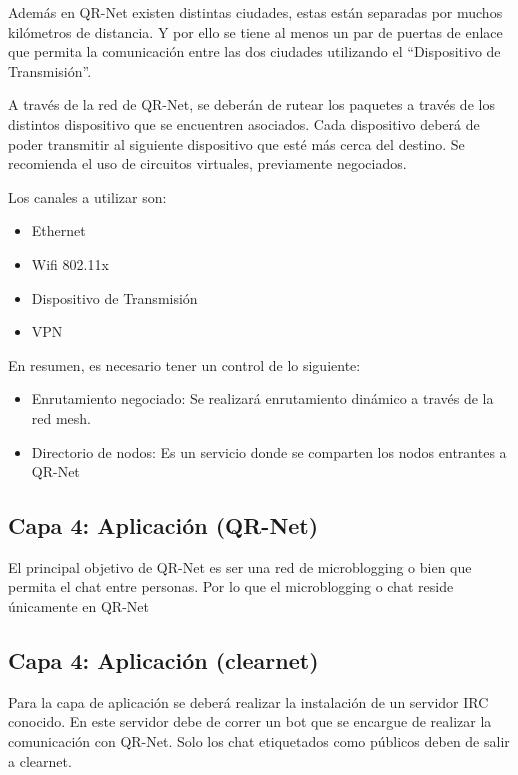 \documentclass{article}
\providecommand{\tightlist}{%
          \setlength{\itemsep}{0pt}\setlength{\parskip}{0pt}}
\begin{document}
Además en QR-Net existen distintas ciudades, estas están separadas por
muchos kilómetros de distancia. Y por ello se tiene al menos un par de
puertas de enlace que permita la comunicación entre las dos ciudades
utilizando el ``Dispositivo de Transmisión''.

A través de la red de QR-Net, se deberán de rutear los paquetes a través
de los distintos dispositivo que se encuentren asociados. Cada
dispositivo deberá de poder transmitir al siguiente dispositivo que esté
más cerca del destino. Se recomienda el uso de circuitos virtuales,
previamente negociados.

Los canales a utilizar son:

\begin{itemize}
\tightlist
\item
  Ethernet
\item
  Wifi 802.11x
\item
  Dispositivo de Transmisión
\item
  VPN
\end{itemize}

En resumen, es necesario tener un control de lo siguiente:

\begin{itemize}
\tightlist
\item
  Enrutamiento negociado: Se realizará enrutamiento dinámico a través de
  la red mesh.
\item
  Directorio de nodos: Es un servicio donde se comparten los nodos
  entrantes a QR-Net
\end{itemize}

\subsection{Capa 4: Aplicación
(QR-Net)}\label{capa-4-aplicaciuxf3n-qr-net}

El principal objetivo de QR-Net es ser una red de microblogging o bien
que permita el chat entre personas. Por lo que el microblogging o chat
reside únicamente en QR-Net

\subsection{Capa 4: Aplicación
(clearnet)}\label{capa-4-aplicaciuxf3n-clearnet}

Para la capa de aplicación se deberá realizar la instalación de un
servidor IRC conocido. En este servidor debe de correr un bot que se
encargue de realizar la comunicación con QR-Net. Solo los chat
etiquetados como públicos deben de salir a clearnet.
\end{document}
